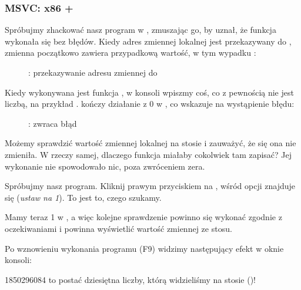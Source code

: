 \clearpage
\subsubsection{MSVC: x86 + \olly}

Spróbujmy zhackować nasz program w \olly, zmuszając go, by uznał, że funkcja \scanf wykonała się bez błędów.
Kiedy adres zmiennej lokalnej jest przekazywany do \scanf,
zmienna początkowo zawiera przypadkową wartość, w tym wypadku :

\begin{figure}[H]
\centering
{}
\caption{\olly: przekazywanie adresu zmiennej do \scanf}
\label{fig:scanf_ex3_olly_1}
\end{figure}

\clearpage
Kiedy wykonywana jest funkcja \scanf , w konsoli wpiszmy coś, co z pewnością nie jest liczbą, na przykład .
\scanf kończy działanie z 0 w \EAX, co wskazuje na wystąpienie błędu:

\begin{figure}[H]
\centering
{}
\caption{\olly: \scanf zwraca błąd}
\label{fig:scanf_ex3_olly_2}
\end{figure}

Możemy sprawdzić wartość zmiennej lokalnej na stosie i zauważyć, że się ona nie zmieniła.
W rzeczy samej, dlaczego funkcja \scanf miałaby cokolwiek tam zapisać?
Jej wykonanie nie spowodowało nic, poza zwróceniem zera.

Spróbujmy  nasz program.
Kliknij prawym przyciskiem na \EAX,
wśród opcji znajduje się  (\emph{ustaw na 1}).
To jest to, czego szukamy.

Mamy teraz 1 w \EAX, a więc kolejne sprawdzenie powinno się wykonać zgodnie z oczekiwaniami i
\printf powinna wyświetlić wartość zmiennej ze stosu.

Po wznowieniu wykonania programu (F9) widzimy następujący efekt w oknie konsoli:



1850296084 to postać dziesiętna liczby, którą widzieliśmy na stosie ()!
